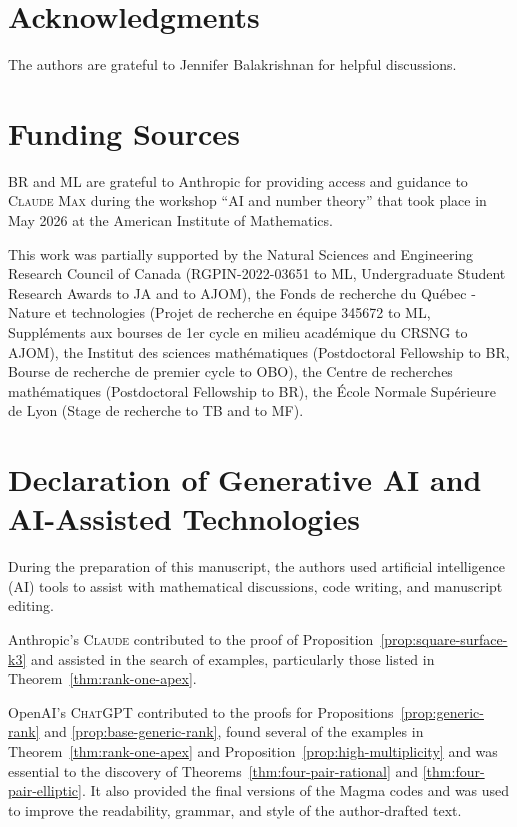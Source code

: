 \documentclass[11pt]{amsart}
\theoremstyle{plain}
\theoremstyle{remark}
\theoremstyle{plain}
\begin{document}
\section*{Acknowledgments}
The authors are grateful to Jennifer Balakrishnan for helpful discussions.



\section*{Funding Sources}

BR and ML are grateful to Anthropic for providing access and guidance to \textsc{Claude Max} during the workshop ``AI and number theory'' that took place in May 2026 at the American Institute of Mathematics.

This work was partially supported by the Natural Sciences and Engineering Research Council of Canada (RGPIN-2022-03651 to ML, Undergraduate Student Research Awards to JA and to AJOM), the Fonds de recherche du Qu\'ebec - Nature et technologies (Projet de recherche en \'equipe 345672 to ML,
Suppl\'ements aux bourses de 1er cycle en milieu acad\'emique du CRSNG to AJOM), the  Institut des sciences math\'ematiques (Postdoctoral Fellowship to BR, Bourse de recherche de premier cycle to OBO), the Centre de recherches math\'ematiques (Postdoctoral Fellowship to BR), the \'Ecole Normale Sup\'erieure de Lyon (Stage de recherche to TB and to MF).

\section*{Declaration of Generative AI and AI-Assisted Technologies} During the preparation of this manuscript, the authors used artificial intelligence (AI) tools to assist with mathematical discussions, code writing, and manuscript editing.

Anthropic's \textsc{Claude} contributed to the proof of Proposition~\ref{prop:square-surface-k3} and assisted in the search of examples, particularly those listed in Theorem~\ref{thm:rank-one-apex}.

OpenAI's \textsc{ChatGPT} contributed to the proofs for Propositions~\ref{prop:generic-rank} and \ref{prop:base-generic-rank}, found several of the examples in Theorem~\ref{thm:rank-one-apex} and  Proposition~\ref{prop:high-multiplicity} and was essential to the discovery of Theorems~\ref{thm:four-pair-rational} and \ref{thm:four-pair-elliptic}. It also provided the final versions of the Magma codes and was used  to improve the readability, grammar, and style of the author-drafted text.
\end{document}
